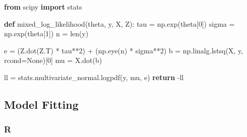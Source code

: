 \documentclass[
  letterpaper,
]{krantz}
\newenvironment{Shaded}{}{}
\newcommand{\AttributeTok}[1]{\textcolor[rgb]{0.49,0.56,0.16}{#1}}
\newcommand{\BuiltInTok}[1]{\textcolor[rgb]{0.00,0.50,0.00}{#1}}
\newcommand{\ControlFlowTok}[1]{\textcolor[rgb]{0.00,0.44,0.13}{\textbf{#1}}}
\newcommand{\DecValTok}[1]{\textcolor[rgb]{0.25,0.63,0.44}{#1}}
\newcommand{\FloatTok}[1]{\textcolor[rgb]{0.25,0.63,0.44}{#1}}
\newcommand{\FunctionTok}[1]{\textcolor[rgb]{0.02,0.16,0.49}{#1}}
\newcommand{\ImportTok}[1]{\textcolor[rgb]{0.00,0.50,0.00}{\textbf{#1}}}
\newcommand{\KeywordTok}[1]{\textcolor[rgb]{0.00,0.44,0.13}{\textbf{#1}}}
\newcommand{\NormalTok}[1]{#1}
\newcommand{\OperatorTok}[1]{\textcolor[rgb]{0.40,0.40,0.40}{#1}}
\newcommand{\OtherTok}[1]{\textcolor[rgb]{0.00,0.44,0.13}{#1}}
\newcommand{\SpecialCharTok}[1]{\textcolor[rgb]{0.25,0.44,0.63}{#1}}
\newcommand{\StringTok}[1]{\textcolor[rgb]{0.25,0.44,0.63}{#1}}
\newcommand{\VariableTok}[1]{\textcolor[rgb]{0.10,0.09,0.49}{#1}}
\begin{document}
\begin{Shaded}
\begin{Highlighting}[]
\ImportTok{from}\NormalTok{ scipy }\ImportTok{import}\NormalTok{ stats}

\KeywordTok{def}\NormalTok{ mixed\_log\_likelihood(theta, y, X, Z):}
\NormalTok{    tau }\OperatorTok{=}\NormalTok{ np.exp(theta[}\DecValTok{0}\NormalTok{])}
\NormalTok{    sigma }\OperatorTok{=}\NormalTok{ np.exp(theta[}\DecValTok{1}\NormalTok{])}
\NormalTok{    n }\OperatorTok{=} \BuiltInTok{len}\NormalTok{(y)}
    
\NormalTok{    e }\OperatorTok{=}\NormalTok{ (Z.dot(Z.T) }\OperatorTok{*}\NormalTok{ tau}\OperatorTok{**}\DecValTok{2}\NormalTok{) }\OperatorTok{+}\NormalTok{ (np.eye(n) }\OperatorTok{*}\NormalTok{ sigma}\OperatorTok{**}\DecValTok{2}\NormalTok{)}
\NormalTok{    b }\OperatorTok{=}\NormalTok{ np.linalg.lstsq(X, y, rcond}\OperatorTok{=}\VariableTok{None}\NormalTok{)[}\DecValTok{0}\NormalTok{]}
\NormalTok{    mu }\OperatorTok{=}\NormalTok{ X.dot(b) }
    
\NormalTok{    ll }\OperatorTok{=}\NormalTok{ stats.multivariate\_normal.logpdf(y, mu, e)}
    \ControlFlowTok{return} \OperatorTok{{-}}\NormalTok{ll}
\end{Highlighting}
\end{Shaded}

\subsection{Model Fitting}\label{model-fitting-4}

\subsubsection{R}

\begin{Shaded}
\end{Shaded}
\end{document}
